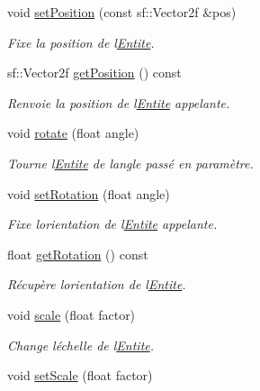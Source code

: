 \begin{DoxyCompactItemize}
void \mbox{\hyperlink{class_entite_aa7fe4a7ebd8eb4c80ef9fdb7d97f2dad}{set\+Position}} (const sf\+::\+Vector2f \&pos)
\begin{DoxyCompactList}\small\item\em Fixe la position de l\textquotesingle{}\mbox{\hyperlink{class_entite}{Entite}}. \end{DoxyCompactList}\item 
sf\+::\+Vector2f \mbox{\hyperlink{class_entite_a6f6fd1e1f9f6ad44f0ecc74961a774d9}{get\+Position}} () const
\begin{DoxyCompactList}\small\item\em Renvoie la position de l\textquotesingle{}\mbox{\hyperlink{class_entite}{Entite}} appelante. \end{DoxyCompactList}\item 
void \mbox{\hyperlink{class_entite_af1249039d313e4e691a109440663eae7}{rotate}} (float angle)
\begin{DoxyCompactList}\small\item\em Tourne l\textquotesingle{}\mbox{\hyperlink{class_entite}{Entite}} de l\textquotesingle{}angle passé en paramètre. \end{DoxyCompactList}\item 
void \mbox{\hyperlink{class_entite_a8623ac815e34b553098f45696ea8918b}{set\+Rotation}} (float angle)
\begin{DoxyCompactList}\small\item\em Fixe l\textquotesingle{}orientation de l\textquotesingle{}\mbox{\hyperlink{class_entite}{Entite}} appelante. \end{DoxyCompactList}\item 
float \mbox{\hyperlink{class_entite_a7f19439f7e7a5028f4b26eff21683de9}{get\+Rotation}} () const
\begin{DoxyCompactList}\small\item\em Récupère l\textquotesingle{}orientation de l\textquotesingle{}\mbox{\hyperlink{class_entite}{Entite}}. \end{DoxyCompactList}\item 
void \mbox{\hyperlink{class_entite_a770f6c53856606c4de768bb942299659}{scale}} (float factor)
\begin{DoxyCompactList}\small\item\em Change l\textquotesingle{}échelle de l\textquotesingle{}\mbox{\hyperlink{class_entite}{Entite}}. \end{DoxyCompactList}\item 
void \mbox{\hyperlink{class_entite_a665939253829baba965ce3ead0f1739c}{set\+Scale}} (float factor)

\end{DoxyCompactItemize}
